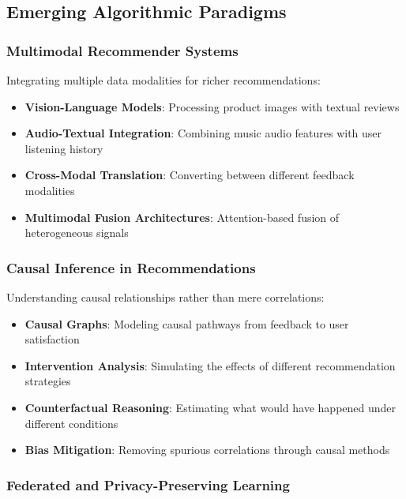 \subsection{Emerging Algorithmic Paradigms}

\subsubsection{Multimodal Recommender Systems}

Integrating multiple data modalities for richer recommendations:

\begin{itemize}
    \item \textbf{Vision-Language Models}: Processing product images with textual reviews
    \item \textbf{Audio-Textual Integration}: Combining music audio features with user listening history
    \item \textbf{Cross-Modal Translation}: Converting between different feedback modalities
    \item \textbf{Multimodal Fusion Architectures}: Attention-based fusion of heterogeneous signals
\end{itemize}

\subsubsection{Causal Inference in Recommendations}

Understanding causal relationships rather than mere correlations:

\begin{itemize}
    \item \textbf{Causal Graphs}: Modeling causal pathways from feedback to user satisfaction
    \item \textbf{Intervention Analysis}: Simulating the effects of different recommendation strategies
    \item \textbf{Counterfactual Reasoning}: Estimating what would have happened under different conditions
    \item \textbf{Bias Mitigation}: Removing spurious correlations through causal methods
\end{itemize}

\subsubsection{Federated and Privacy-Preserving Learning}

